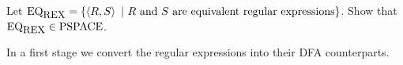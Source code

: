 \documentclass{article}
\begin{document}
\begin{exercise}
Let $\mbox{EQ}_{\mbox{\small{REX}}}=\left\{ \left\langle R,S \right\rangle\ |\ \mbox{$R$ and $S$ are equivalent regular expressions} \right\}$. Show that $\mbox{EQ}_{\mbox{\small{REX}}}\in\mbox{PSPACE}$.
\begin{answer}
In a first stage we convert the regular expressions into their DFA counterparts. 
\end{answer}
\end{exercise}
\end{document}
